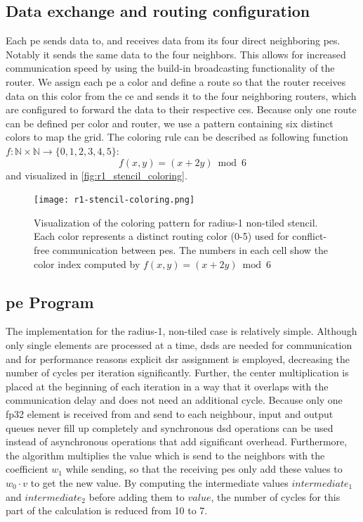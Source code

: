 \subsection{Data exchange and routing configuration}
Each \ac{pe} sends data to, and receives data from its four direct neighboring \acp{pe}. Notably it sends the same data to the four neighbors. This allows for increased communication speed by using the build-in broadcasting functionality of the router. We assign each \ac{pe} a color and define a route so that the router receives data on this color from the \ac{ce} and sends it to the four neighboring routers, which are configured to forward the data to their respective \acp{ce}. Because only one route can be defined per color and router, we use a pattern containing six distinct colors to map the grid.
The coloring rule can be described as following function $f:\mathbb{N}\times\mathbb{N}\to\{0,1,2,3,4,5\}$:
\begin{equation}
    \label{eq:coloring_function}
    f(x,y) = (x + 2y) \bmod 6
\end{equation}
and visualized in \autoref{fig:r1_stencil_coloring}.
\begin{figure}
    \centering
    \texttt{[image: r1-stencil-coloring.png]}
    \caption{Visualization of the coloring pattern for radius-1 non-tiled stencil. Each color represents a distinct routing color (0-5) used for conflict-free communication between \acp{pe}. The numbers in each cell show the color index computed by $f(x,y) = (x + 2y) \bmod 6$}
    \label{fig:r1_stencil_coloring}
\end{figure}

\subsection{\ac{pe} Program}
The implementation for the radius-1, non-tiled case is relatively simple.
Although only single elements are processed at a time, \acp{dsd} are needed for communication and for performance reasons explicit \ac{dsr} assignment is employed, decreasing the number of cycles per iteration significantly.  
Further, the center multiplication is placed at the beginning of each iteration in a way that it overlaps with the communication delay and does not need an additional cycle.
Because only one fp32 element is received from and send to each neighbour, input and output queues never fill up completely and synchronous \ac{dsd} operations can be used instead of asynchronous operations that add significant overhead.
Furthermore, the algorithm multiplies the value which is send to the neighbors with the coefficient $w_1$ while sending, so that the receiving \acp{pe} only add these values to $w_0 \cdot v$ to get the new value.
By computing the intermediate values $intermediate_1$ and $intermediate_2$ before adding them to $value$, the number of cycles for this part of the calculation is reduced from 10 to 7.

